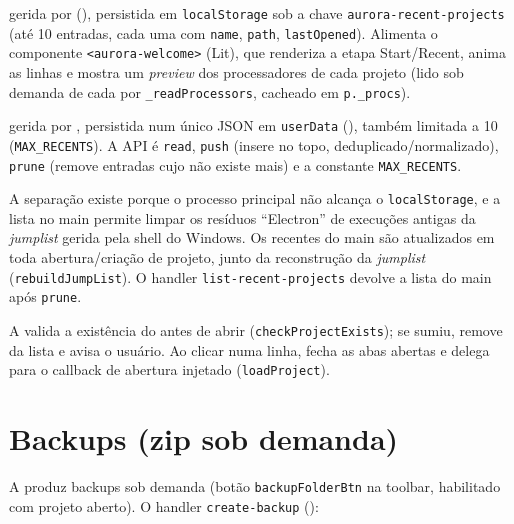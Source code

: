 \begin{description}[leftmargin=2em,style=nextline]
  \item[Tela de boas-vindas (renderer)] gerida por
     (),
    persistida em \lstinline|localStorage| sob a chave
    \lstinline|aurora-recent-projects| (até 10 entradas, cada uma com
    \lstinline|name|, \lstinline|path|, \lstinline|lastOpened|). Alimenta o
    componente \lstinline|<aurora-welcome>| (Lit), que renderiza a etapa
    Start/Recent, anima as linhas e mostra um \emph{preview} dos processadores
    de cada projeto (lido sob demanda de cada  por
    \lstinline|_readProcessors|, cacheado em \lstinline|p._procs|).
  \item[\emph{Jumplist} do Windows (processo principal)] gerida por
    , persistida num único JSON em \lstinline|userData|
    (), também limitada a 10 (\lstinline|MAX_RECENTS|).
    A API é \lstinline|read|, \lstinline|push| (insere no topo,
    deduplicado/normalizado), \lstinline|prune| (remove entradas cujo 
    não existe mais) e a constante \lstinline|MAX_RECENTS|.
\end{description}

A separação existe porque o processo principal não alcança o
\lstinline|localStorage|, e a lista no main permite limpar os resíduos
\enquote{Electron} de execuções antigas da \emph{jumplist} gerida pela shell do
Windows. Os recentes do main são atualizados em toda abertura/criação de
projeto, junto da reconstrução da \emph{jumplist} (\lstinline|rebuildJumpList|).
O handler \lstinline|list-recent-projects| devolve a lista do main após
\lstinline|prune|.

A  valida a existência do  antes de abrir
(\lstinline|checkProjectExists|); se sumiu, remove da lista e avisa o usuário.
Ao clicar numa linha, fecha as abas abertas e delega para o callback de abertura
injetado (\lstinline|loadProject|).

\section{Backups (zip sob demanda)}

A  produz backups  sob demanda (botão
\lstinline|backupFolderBtn| na toolbar, habilitado com projeto aberto). O
handler \lstinline|create-backup| ():

